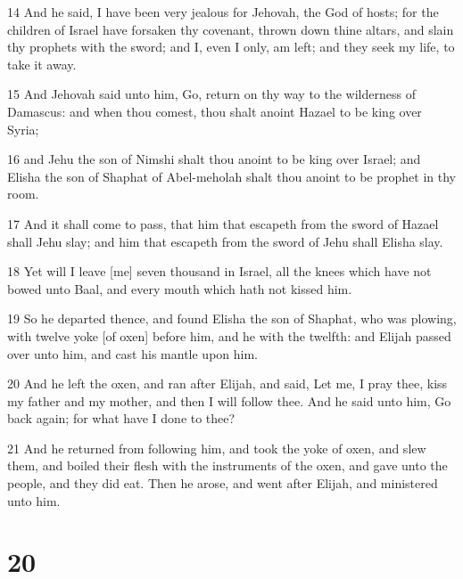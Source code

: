 \par 14 And he said, I have been very jealous for Jehovah, the God of hosts; for the children of Israel have forsaken thy covenant, thrown down thine altars, and slain thy prophets with the sword; and I, even I only, am left; and they seek my life, to take it away.
\par 15 And Jehovah said unto him, Go, return on thy way to the wilderness of Damascus: and when thou comest, thou shalt anoint Hazael to be king over Syria;
\par 16 and Jehu the son of Nimshi shalt thou anoint to be king over Israel; and Elisha the son of Shaphat of Abel-meholah shalt thou anoint to be prophet in thy room.
\par 17 And it shall come to pass, that him that escapeth from the sword of Hazael shall Jehu slay; and him that escapeth from the sword of Jehu shall Elisha slay.
\par 18 Yet will I leave [me] seven thousand in Israel, all the knees which have not bowed unto Baal, and every mouth which hath not kissed him.
\par 19 So he departed thence, and found Elisha the son of Shaphat, who was plowing, with twelve yoke [of oxen] before him, and he with the twelfth: and Elijah passed over unto him, and cast his mantle upon him.
\par 20 And he left the oxen, and ran after Elijah, and said, Let me, I pray thee, kiss my father and my mother, and then I will follow thee. And he said unto him, Go back again; for what have I done to thee?
\par 21 And he returned from following him, and took the yoke of oxen, and slew them, and boiled their flesh with the instruments of the oxen, and gave unto the people, and they did eat. Then he arose, and went after Elijah, and ministered unto him.

\chapter{20}

